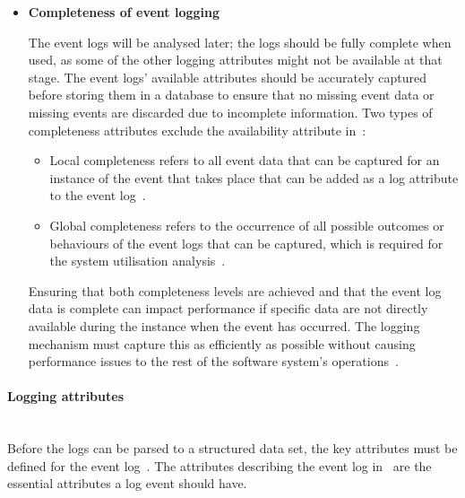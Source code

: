 \begin{itemize}
	\item \textbf{Completeness of event logging}\par The event logs will be analysed later; the logs should be fully complete when used, as some of the other logging attributes might not be available at that stage. The event logs' available attributes should be accurately captured before storing them in a database to ensure that no missing event data or missing events are discarded due to incomplete information. Two types of completeness attributes exclude the availability attribute in~:

	\begin{itemize}
		\item Local completeness refers to all event data that can be captured for an instance of the event that takes place that can be added as a log attribute to the event log~\cite{Kherbouche2017, VanDerAalst2004}.
		\item Global completeness refers to the occurrence of all possible outcomes or behaviours of the event logs that can be captured, which is required for the system utilisation analysis~\cite{Kherbouche2017, VanDerAalst2004}.
	\end{itemize}

	Ensuring that both completeness levels are achieved and that the event log data is complete can impact performance if specific data are not directly available during the instance when the event has occurred. The logging mechanism must capture this as efficiently as possible without causing performance issues to the rest of the software system's operations~\cite{Zhu2015, Zhu2019}. 
\end{itemize}

\paragraph{Logging attributes}\leavevmode\\
Before the logs can be parsed to a structured data set, the key attributes must be defined for the event log~\cite{Bekeneva2020}. The attributes describing the event log in~ are the essential attributes a log event should have. 

